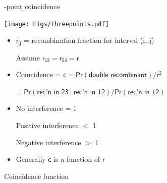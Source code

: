 \documentclass[12pt]{article}
\newcommand{\headsize}{\fontsize{35}{35} \selectfont}
\newcommand{\smallsize}{\fontsize{25}{30} \selectfont}
\begin{document}
{\headsize \color{myyellow}
\hfill
\begin{minipage}{5.75in}
-point coincidence
\end{minipage}

\vspace*{1cm}

\hfill \begin{minipage}{9.5in}
\texttt{[image: Figs/threepoints.pdf]}

\vspace{1cm}

\color{mywhite} \smallsize
\begin{itemize}
\itemsep24pt
\setlength{\rightskip}{0pt plus 1fil} %

\item $\mathsf{r_{ij}}$ = recombination fraction for interval (i, j)

{\color{myblue} Assume $\mathsf{r_{12} = r_{23} = r}$.}

\item {\color{mypink} Coincidence} = $\mathsf{c = Pr(\text{double
  recombinant}) / r^2}$

\hspace{20mm} {\color{myblue} = $\mathsf{Pr(\text{rec'n in 23} \ |
    \ \text{rec'n in 12}) /
  Pr(\text{rec'n in 12})}$}

\item
No interference { \color{myblue} = 1 }

Positive interference { \color{myblue} $<$ 1 }

Negative interference { \color{myblue} $>$ 1  }


\item Generally {\color{myblue} $\mathsf{c}$} is a function of
  {\color{myblue} $\mathsf{r}$}

\end{itemize}

\end{minipage} \hspace{0.25in}



\newpage


\headsize \color{myyellow}
\hfill \begin{minipage}{5.75in}
\centering
Coincidence function
\end{minipage}

\vspace{15mm}

}
\end{document}
